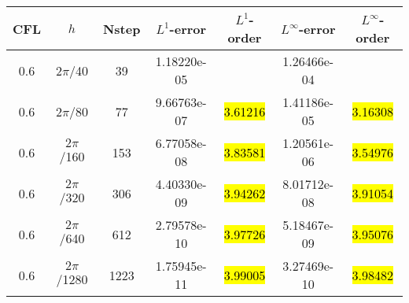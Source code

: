 \def\titleintable{CFL&$h$&Nstep&$L^1$-error&$L^1$-order&$L^\infty$-error&$L^\infty$-order\\}

\begin{table}[htbp]
	\label{ta:1D-ex3-WHC4}
	\centering
	\begin{tabular}{ccccccc}
		\toprule
		\titleintable
		\midrule
		0.6 & $2\pi$/40   & 39   & 1.18220e-05 &              & 1.26466e-04 &              \\
		0.6 & $2\pi$/80   & 77   & 9.66763e-07 & \hl{3.61216} & 1.41186e-05 & \hl{3.16308} \\
		0.6 & $2\pi$/160  & 153  & 6.77058e-08 & \hl{3.83581} & 1.20561e-06 & \hl{3.54976} \\
		0.6 & $2\pi$/320  & 306  & 4.40330e-09 & \hl{3.94262} & 8.01712e-08 & \hl{3.91054} \\
		0.6 & $2\pi$/640  & 612  & 2.79578e-10 & \hl{3.97726} & 5.18467e-09 & \hl{3.95076} \\
		0.6 & $2\pi$/1280 & 1223 & 1.75945e-11 & \hl{3.99005} & 3.27469e-10 & \hl{3.98482} \\
		\bottomrule
	\end{tabular}
\end{table}

